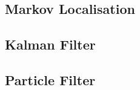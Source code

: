 \subsection{Markov Localisation}


\subsection{Kalman Filter}
\lipsum[7] %

\subsection{Particle Filter}
\lipsum[7] %
